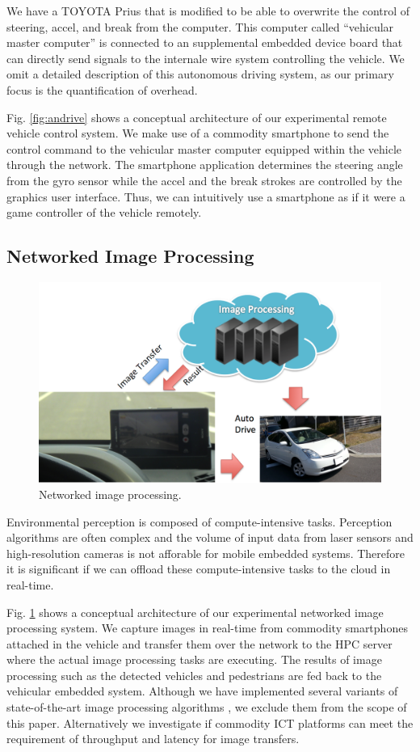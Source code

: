 We have a TOYOTA Prius that is modified to be able to overwrite the
control of steering, accel, and break from the computer.
This computer called ``vehicular master computer'' is connected to an
supplemental embedded device board that can directly send signals to the
internale wire system controlling the vehicle.
We omit a detailed description of this autonomous driving system, as our
primary focus is the quantification of overhead.

Fig. \ref{fig:andrive} shows a conceptual architecture of our
experimental remote vehicle control system.
We make use of a commodity smartphone to send the control command to the
vehicular master computer equipped within the vehicle through the network.
The smartphone application determines the steering angle from the gyro
sensor while the accel and the break strokes are controlled by the
graphics user interface.
Thus, we can intuitively use a smartphone as if it were a game
controller of the vehicle remotely.

\subsection{Networked Image Processing}

\begin{figure}[!t]
 \centering
 \includegraphics[width=0.9\hsize]{fig/TIPIC.pdf}
 \caption{Networked image processing.}
 \label{fig:tipic}
\end{figure}

Environmental perception is composed of compute-intensive tasks.
Perception algorithms are often complex and the volume of input data
from laser sensors and high-resolution cameras is not afforable for
mobile embedded systems.
Therefore it is significant if we can offload these compute-intensive
tasks to the cloud in real-time.

Fig. \ref{fig:tipic} shows a conceptual architecture of our experimental
networked image processing system.
We capture images in real-time from commodity smartphones attached in
the vehicle and transfer them over the network to the HPC server where
the actual image processing tasks are executing.
The results of image processing such as the detected vehicles and
pedestrians are fed back to the vehicular embedded system.
Although we have implemented several variants of state-of-the-art image
processing algorithms \cite{Hirabayashi13}, we exclude them from the
scope of this paper.
Alternatively we investigate if commodity ICT platforms can meet the
requirement of throughput and latency for image transfers.

